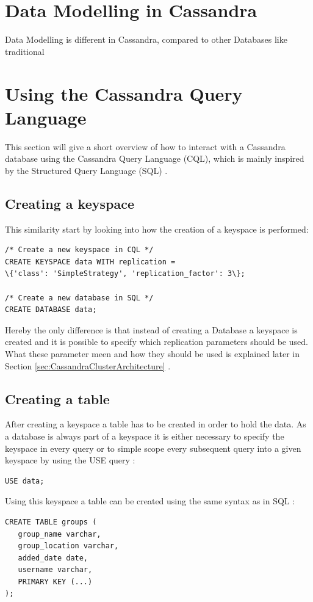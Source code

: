 \section{Data Modelling in Cassandra}  %



Data Modelling is different in Cassandra, compared to other Databases like traditional

\section{Using the Cassandra Query Language}  %
This section will give a short overview of how to interact with a Cassandra database using the Cassandra Query Language (CQL), which is mainly inspired by the Structured Query Language (SQL) \autocite{cqlAlexMeng, newInCQL3, cassandra3cqldocCreateKeystore}.

\subsection {Creating a keyspace}
This similarity start by looking into how the creation of a keyspace is performed:
\begin{verbatim}
/* Create a new keyspace in CQL */
CREATE KEYSPACE data WITH replication =
\{'class': 'SimpleStrategy', 'replication_factor': 3\};

/* Create a new database in SQL */
CREATE DATABASE data;
\end{verbatim}
Hereby the only difference is that instead of creating a Database a keyspace is created and it is possible to specify which replication parameters should be used. What these parameter meen and how they should be used is explained later in Section \ref{sec:CassandraClusterArchitecture} \autocite{cqlAlexMeng}.

\subsection{Creating a table}
After creating a keyspace a table has to be created in order to hold the data. As a database is always part of a keyspace it is either necessary to specify the keyspace in every query or to simple scope every subsequent query into a given keyspace by using the USE query \autocite{cassandra3cqldocUse}:
\begin{verbatim}
USE data;
\end{verbatim}

Using this keyspace a table can be created using the same syntax as in SQL \autocite{cqlAlexMeng, newInCQL3, cassandra3cqldocCreateTable}:
\begin{verbatim}
CREATE TABLE groups (
   group_name varchar,
   group_location varchar,
   added_date date,
   username varchar,
   PRIMARY KEY (...)
);
\end{verbatim}

